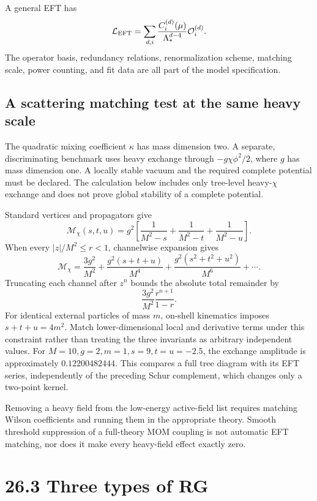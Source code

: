 \documentclass[
  11pt,
  oneside]{book}
\begin{document}
A general EFT has \[
\mathcal L_{\rm EFT}=\sum_{d,i}\frac{C_i^{(d)}(\mu)}
{\Lambda_*^{d-4}}\mathcal O_i^{(d)}.
\] The operator basis, redundancy relations, renormalization scheme,
matching scale, power counting, and fit data are all part of the model
specification.

\subsection{A scattering matching test at the same heavy scale}

The quadratic mixing coefficient \(\kappa\) has mass dimension two. A
separate, discriminating benchmark uses heavy exchange through
\(-g\chi\phi^2/2\), where \(g\) has mass dimension one. A locally stable
vacuum and the required complete potential must be declared. The
calculation below includes only tree-level heavy-\(\chi\) exchange and
does not prove global stability of a complete potential.

Standard vertices and propagators give \[
\mathcal M_\chi(s,t,u)=g^2\left[\frac1{M^2-s}+\frac1{M^2-t}+\frac1{M^2-u}\right].
\] When every \(|z|/M^2\le r<1\), channelwise expansion gives \[
\mathcal M_\chi=
\frac{3g^2}{M^2}+\frac{g^2(s+t+u)}{M^4}
+\frac{g^2(s^2+t^2+u^2)}{M^6}+\cdots.
\] Truncating each channel after \(z^n\) bounds the absolute total
remainder by \[
\frac{3g^2}{M^2}\frac{r^{n+1}}{1-r}.
\] For identical external particles of mass \(m\), on-shell kinematics
imposes \(s+t+u=4m^2\). Match lower-dimensional local and derivative
terms under this constraint rather than treating the three invariants as
arbitrary independent values. For \(M=10,g=2,m=1,s=9,t=u=-2.5\), the
exchange amplitude is approximately \(0.12200482444\). This compares a
full tree diagram with its EFT series, independently of the preceding
Schur complement, which changes only a two-point kernel.

Removing a heavy field from the low-energy active-field list requires
matching Wilson coefficients and running them in the appropriate theory.
Smooth threshold suppression of a full-theory MOM coupling is not
automatic EFT matching, nor does it make every heavy-field effect
exactly zero.

\section{26.3 Three types of RG}
\end{document}
